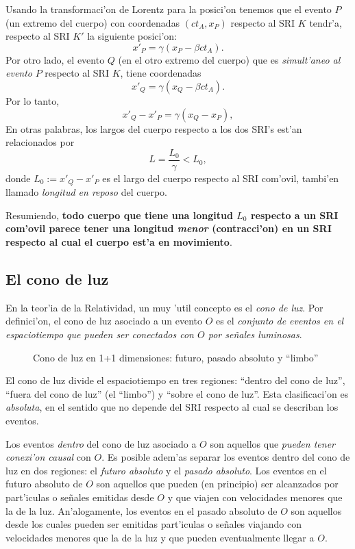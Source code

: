  Usando la transformaci'on de Lorentz para la posici'on tenemos que el evento $P$ (un extremo del cuerpo) con coordenadas $(ct_A,x_P)$ respecto al SRI $K$ tendr'a, respecto al SRI $K'$ la siguiente posici'on:
\begin{equation}
x'_P=\gamma(x_P-\beta c t_A).
\end{equation}
Por otro lado, el evento $Q$ (en el otro extremo del cuerpo) que es \textit{simult'aneo al evento} $P$ respecto al SRI $K$, tiene coordenadas
\begin{equation}
x'_Q=\gamma(x_Q-\beta c t_A).
\end{equation}
Por lo tanto,
\begin{equation}
x'_Q-x'_P=\gamma(x_Q-x_P),
\end{equation}
En otras palabras, los largos del cuerpo respecto a los dos SRI's est'an relacionados por
\begin{equation}
L=\frac{L_0}{\gamma}<L_0,
\end{equation}
donde $L_0:=x'_Q-x'_P$ es el largo del cuerpo respecto al SRI com'ovil, tambi'en llamado \textit{longitud en reposo} del cuerpo.

Resumiendo, \textbf{todo cuerpo que tiene una longitud $L_0$ respecto a un SRI com'ovil parece tener una longitud \textit{menor} (contracci'on) en un SRI respecto al cual el cuerpo est'a en movimiento}.

\subsection{El cono de luz}
En la teor'ia de la Relatividad, un muy 'util concepto es el \textit{cono de luz}. Por definici'on, el cono de luz asociado a un evento $O$ es el \textit{conjunto de eventos en el espaciotiempo que pueden ser conectados con $O$ por se\~nales luminosas}.
\begin{figure}[!h]
\centerline{}
 \caption{Cono de luz en 1+1 dimensiones: futuro, pasado absoluto y ``limbo''}
\label{lc}
\end{figure}
El cono de luz divide el espaciotiempo en tres regiones: ``dentro del cono de luz'', ``fuera del cono de luz'' (el ``limbo'') y ``sobre el cono de luz''. Esta clasificaci'on es \textit{absoluta}, en el sentido que no depende del SRI respecto al cual se describan los eventos.

Los eventos \textit{dentro} del cono de luz asociado a $O$ son aquellos que \textit{pueden tener conexi'on causal} con $O$. Es posible adem'as separar los eventos dentro del cono de luz en dos regiones: el \textit{futuro absoluto} y el \textit{pasado absoluto}. Los eventos en el futuro absoluto de $O$ son aquellos que pueden (en principio) ser alcanzados por part'iculas o se\~nales emitidas desde  $O$  y que viajen con velocidades menores que la de la luz. An'alogamente, los eventos en el pasado absoluto de $O$ son aquellos desde los cuales pueden ser emitidas part'iculas o se\~nales viajando con velocidades menores que la de la luz y que pueden eventualmente llegar a $O$. 

